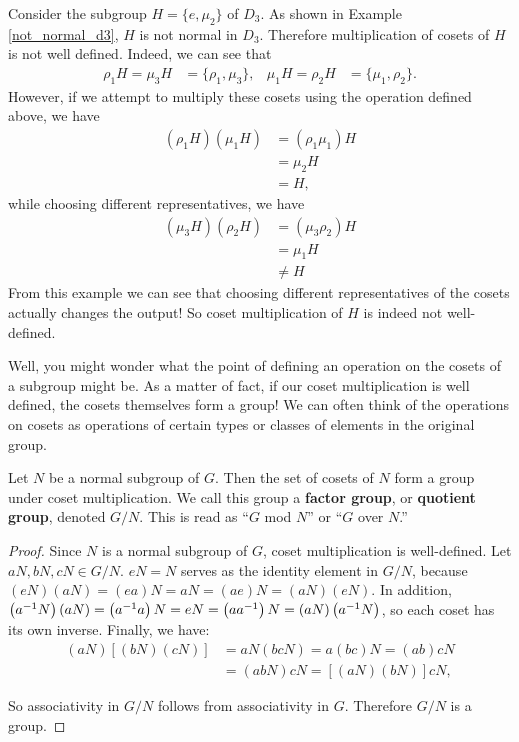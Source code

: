 \begin{example}
Consider the subgroup $H = \{e, \mu_2\}$ of $D_3$. As shown in Example \ref{not_normal_d3}, $H$ is not normal in $D_3$. Therefore multiplication of cosets of $H$ is not well defined. Indeed, we can see that
\begin{align*}
    \rho_1H = \mu_3H &= \{\rho_1, \mu_3\}, & \mu_1H = \rho_2H &= \{\mu_1, \rho_2\}.
\end{align*}
However, if we attempt to multiply these cosets using the operation defined above, we have
\begin{align*}
    \left(\rho_1H\right)\left(\mu_1H\right) &= \left(\rho_1 \mu_1\right)H \\
    &= \mu_2 H \\
    &= H,
\end{align*}
while choosing different representatives, we have
\begin{align*}
    \left(\mu_3H\right)\left(\rho_2H\right) &= \left(\mu_3 \rho_2\right)H \\
    &= \mu_1 H \\
    &\neq H
\end{align*}
From this example we can see that choosing different representatives of the cosets actually changes the output! So coset multiplication of $H$ is indeed not well-defined.
\end{example}

Well, you might wonder what the point of defining an operation on the cosets of a subgroup might be. As a matter of fact, if our coset multiplication is well defined, the cosets themselves form a group! We can often think of the operations on cosets as operations of certain types or classes of elements in the original group.

\begin{theorem}
Let $N$ be a normal subgroup of $G$. Then the set of cosets of $N$ form a group under coset multiplication. We call this group a \textbf{factor group}, or \textbf{quotient group}, denoted $G/N$. This is read as ``$G$ mod $N$'' or ``$G$ over $N$.''
\end{theorem}

\begin{proof}
Since $N$ is a normal subgroup of $G$, coset multiplication is well-defined. Let $aN, bN, cN \in G/N$. $eN = N$ serves as the identity element in $G/N$, because $(eN)(aN) = (ea)N = aN = (ae)N = (aN)(eN)$. In addition, $\left(a^{-1} N\right)(aN) = \left(a^{-1} a\right)N = eN = \left(a a^{-1}\right)N = (aN)\left(a^{-1} N\right)$, so each coset has its own inverse. Finally, we have:
\begin{align*}
    (aN)\left[(bN)(cN)\right] &= aN(bcN) = a(bc)N = (ab)cN \\
    &= (abN)cN = \left[(aN)(bN)\right]cN,
\end{align*}

So associativity in $G/N$ follows from associativity in $G$. Therefore $G/N$ is a group.

\end{proof}

